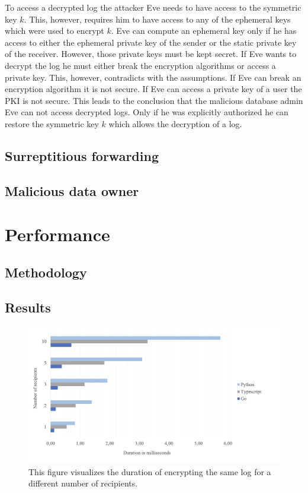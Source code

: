 \documentclass[../main.tex]{subfiles}
\begin{document}
To access a decrypted log the attacker Eve needs to have access to the symmetric key $k$.
This, however, requires him to have access to any of the ephemeral keys which were used to encrypt $k$.
Eve can compute an ephemeral key only if he has access to either the ephemeral private key of the sender or the static private key of the receiver.
However, those private keys must be kept secret.
If Eve wants to decrypt the log he must either break the encryption algorithms or access a private key.
This, however, contradicts with the assumptions.
If Eve can break an encryption algorithm it is not secure.
If Eve can access a private key of a user the PKI is not secure.
This leads to the conclusion that the malicious database admin Eve can not access decrypted logs.
Only if he was explicitly authorized he can restore the symmetric key $k$ which allows the decryption of a log.


\subsection{Surreptitious forwarding}
\subsection{Malicious data owner}

\section{Performance}
\label{sec:evaluation-perf}

\subsection{Methodology}
\subsection{Results}

\begin{figure}[ht]
    \includegraphics[scale=0.3]{../img/07/performance_tests.jpg}
    \centering
    \caption{This figure visualizes the duration of encrypting the same log for a different number of recipients.}
    \label{fig:mutual_encryption}
\end{figure}
\end{document}
